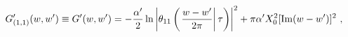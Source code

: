 \begin{equation}
 G'_{(1,1)}(w,w')\equiv G'(w,w')=
  -\frac{\alpha'}{2}\ln \left| \theta_{11}\left(\left.\frac{w-w'}{2\pi}
  \right|\tau \right)
  \right|^2 + \pi\alpha' X_0^2 [{\rm Im}(w-w')]^2\ ,
\end{equation}

